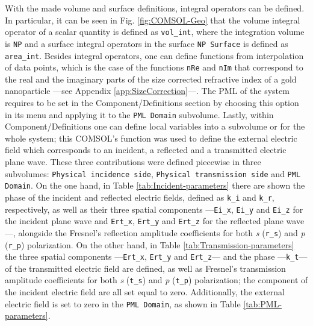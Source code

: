 With the made volume and surface definitions, integral operators can be defined. In particular, it can be seen in Fig. \ref{fig:COMSOL-Geo} that the volume integral operator of a scalar quantity is defined as \lstinline!vol_int!, where the integration volume is \lstinline!NP! and a surface integral operators in the surface \lstinline!NP Surface! is defined as \lstinline!area_int!. Besides integral operators, one can define functions from interpolation of data points, which is the case of the functions \lstinline!nRe! and \lstinline!nIm! that correspond to the real and the imaginary parts of the size corrected refractive index of a gold nanoparticle ---see Appendix \ref{app:SizeCorrection}---. The PML of the system requires to be set in the Component/Definitions section by choosing this option in its menu and applying it to the \lstinline!PML Domain! subvolume. Lastly, within Component/Definitions one can define local variables into a subvolume or for the whole system; this COMSOL's function was used to define the external electric field which corresponds to an incident, a reflected and a transmitted electric plane wave. These three contributions were defined piecewise in three subvolumes: \lstinline!Physical incidence side!, \lstinline!Physical transmission side! and \lstinline!PML Domain!. On the one hand, in Table \ref{tab:Incident-parameters} there are shown the phase of the incident and reflected electric fields, defined as \lstinline!k_i! and \lstinline!k_r!, respectively, as well as their three spatial components ---\lstinline!Ei_x!, \lstinline!Ei_y! and \lstinline!Ei_z! for the incident plane wave and \lstinline!Ert_x!, \lstinline!Ert_y! and \lstinline!Ert_z! for the reflected plane wave---, alongside the Fresnel's reflection amplitude coefficients for both \textit{s} (\lstinline!r_s!) and \textit{p} (\lstinline!r_p!) polarization. On the other hand, in Table \ref{tab:Transmission-parameters} the three spatial components ---\lstinline!Ert_x!, \lstinline!Ert_y! and \lstinline!Ert_z!--- and the phase ---\lstinline!k_t!--- of the transmitted electric field are defined, as well as Fresnel's transmission amplitude coefficients for both \textit{s} (\lstinline!t_s!) and \textit{p} (\lstinline!t_p!) polarization; the component of the incident electric field are all set equal to zero. Additionally, the external electric field is set to zero in the \lstinline!PML Domain!, as shown in Table \ref{tab:PML-parameters}.

